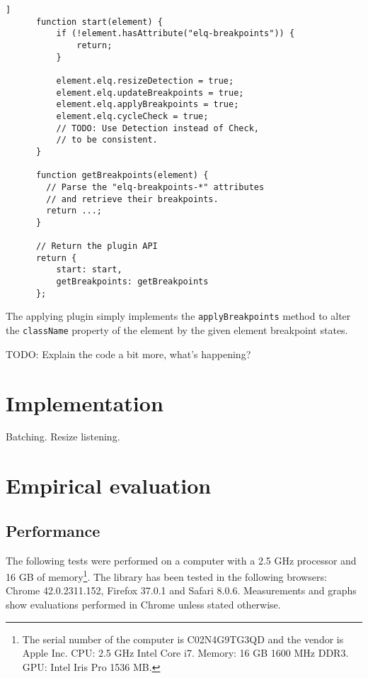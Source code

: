 \documentclass{acm_proc_article-sp}
\newcommand{\code}[1]{\texttt{#1}}
\newcommand{\gls}[1]{#1}
\newcommand{\todo}[1]{}
\begin{document}
    \begin{lstlisting}[gobble=6,caption={},captionpos=b,label={}]]
      function start(element) {
          if (!element.hasAttribute("elq-breakpoints")) {
              return;
          }

          element.elq.resizeDetection = true;
          element.elq.updateBreakpoints = true;
          element.elq.applyBreakpoints = true;
          element.elq.cycleCheck = true;
          // TODO: Use Detection instead of Check, 
          // to be consistent.
      }

      function getBreakpoints(element) {
        // Parse the "elq-breakpoints-*" attributes
        // and retrieve their breakpoints.
        return ...;
      }

      // Return the plugin API
      return {
          start: start,
          getBreakpoints: getBreakpoints
      };
    \end{lstlisting}

    The applying plugin simply implements the \code{applyBreakpoints} method to alter the \code{className} property of the element by the given element breakpoint states.

    TODO: Explain the code a bit more, what's happening?


\section{Implementation}
  Batching.
  Resize listening.

\section{Empirical evaluation}
  \subsection{Performance}
    The following tests were performed on a computer with a 2.5 GHz processor and 16 GB of memory\footnote{The serial number of the computer is C02N4G9TG3QD and the vendor is Apple Inc. CPU: 2.5 GHz Intel Core i7. Memory: 16 GB 1600 MHz DDR3. GPU: Intel Iris Pro 1536 MB.}.
    The library has been tested in the following browsers: Chrome 42.0.2311.152, Firefox 37.0.1 and Safari 8.0.6.
    Measurements and graphs show evaluations performed in Chrome unless stated otherwise.

\end{document}
